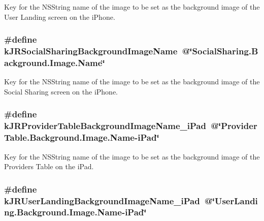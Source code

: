 Key for the {\ttfamily NSString} name of the image to be set as the background image of the User Landing screen on the iPhone. \hypertarget{group__custom_interface_gad2e00942af19ec9478ba58a491a8b8f2}{
\subsubsection[{kJRSocialSharingBackgroundImageName}]{\setlength{\rightskip}{0pt plus 5cm}\#define kJRSocialSharingBackgroundImageName~@\char`\"{}SocialSharing.Background.Image.Name\char`\"{}}}
\label{group__custom_interface_gad2e00942af19ec9478ba58a491a8b8f2}
Key for the {\ttfamily NSString} name of the image to be set as the background image of the Social Sharing screen on the iPhone. \hypertarget{group__custom_interface_ga25b26cff96d8f174f3bdc040031466b7}{
\subsubsection[{kJRProviderTableBackgroundImageName\_\-iPad}]{\setlength{\rightskip}{0pt plus 5cm}\#define kJRProviderTableBackgroundImageName\_\-iPad~@\char`\"{}ProviderTable.Background.Image.Name-\/iPad\char`\"{}}}
\label{group__custom_interface_ga25b26cff96d8f174f3bdc040031466b7}
Key for the {\ttfamily NSString} name of the image to be set as the background image of the Providers Table on the iPad. \hypertarget{group__custom_interface_ga52b4fb3801cf3fe6e5a294d9a4d1ff0a}{
\subsubsection[{kJRUserLandingBackgroundImageName\_\-iPad}]{\setlength{\rightskip}{0pt plus 5cm}\#define kJRUserLandingBackgroundImageName\_\-iPad~@\char`\"{}UserLanding.Background.Image.Name-\/iPad\char`\"{}}}
\label{group__custom_interface_ga52b4fb3801cf3fe6e5a294d9a4d1ff0a}
